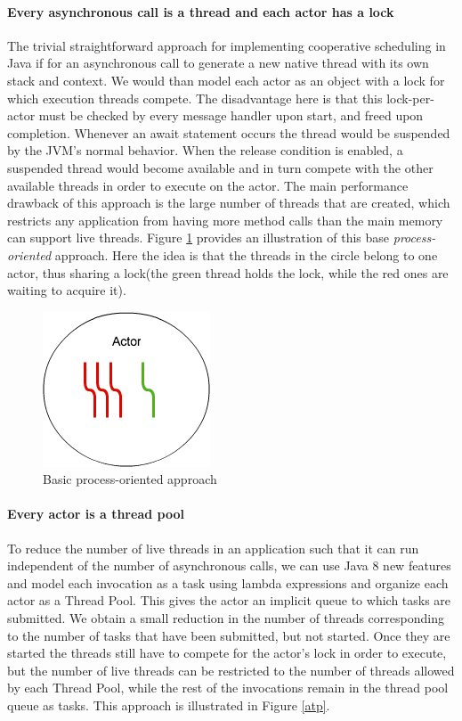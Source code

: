 \paragraph{Every asynchronous call is a thread and each actor has a lock }
The trivial straightforward approach for implementing cooperative scheduling in Java if for an asynchronous call to generate a new native thread with its own stack and context. We would than model each actor as an object with a lock for which execution threads compete. The disadvantage here is that this lock-per-actor must be checked by every message handler upon start, and freed upon completion. Whenever an await statement occurs the thread would be suspended by the JVM's normal behavior. When the release condition is enabled, a suspended thread would become available and in turn compete with the other available threads in order to execute on the actor. The main performance drawback of this approach is the large number of threads that are created, which restricts any application from having more method calls than the main memory can support live threads. Figure \ref{tp} provides an illustration of this base \textit{process-oriented} approach. Here the idea is that the threads in the circle belong to one actor, thus sharing a lock(the green thread holds the lock, while the red ones are waiting to acquire it).

\begin{figure}
	\centering
	\includegraphics[scale=0.5]{mt.png}
	\caption{Basic process-oriented approach}
	\label{tp}
	
\end{figure}

\paragraph{Every actor is a thread pool}
To reduce the number of live threads in an application such that it can run independent of the number of asynchronous calls, we can use Java 8 new features and model each invocation as a task using lambda expressions and organize each actor as a Thread Pool. This gives the actor an implicit queue to which tasks are submitted. We obtain a small reduction in the number of threads corresponding to the number of tasks that have been submitted, but not started.  Once they are started the threads still have to compete for the actor's lock in order to execute, but the number of live threads can be restricted to the number of threads allowed by each Thread Pool, while the rest of the invocations remain in the thread pool queue as tasks. This approach is illustrated in Figure \ref{atp}. 


